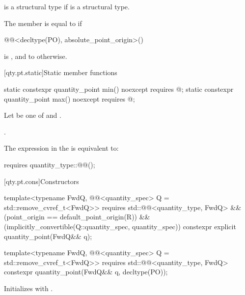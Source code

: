 \pnum
{} is a structural type
if  is a structural type.

\pnum
The member  is equal to  if
\begin{codeblock}
@@<decltype(PO), absolute_point_origin>()
\end{codeblock}
is , and
to  otherwise.

[qty.pt.static]{Static member functions}

\begin{itemdecl}
static constexpr quantity_point min() noexcept
  requires @\seebelownc@;
static constexpr quantity_point max() noexcept
  requires @\seebelownc@;
\end{itemdecl}

\begin{itemdescr}
\pnum
Let  be one of  and .

\pnum
\returns
{}.

\pnum
\remarks
The expression in the  is equivalent to:
\begin{codeblock}
requires { quantity_type::@@(); }
\end{codeblock}
\end{itemdescr}

[qty.pt.cons]{Constructors}

\begin{itemdecl}
template<typename FwdQ, @@<quantity_spec> Q = std::remove_cvref_t<FwdQ>>
  requires std::@@<quantity_type, FwdQ> &&
           (point_origin == default_point_origin(R)) &&
           (implicitly_convertible(Q::quantity_spec, quantity_spec))
constexpr explicit quantity_point(FwdQ&& q);

template<typename FwdQ, @@<quantity_spec> Q = std::remove_cvref_t<FwdQ>>
  requires std::@@<quantity_type, FwdQ>
constexpr quantity_point(FwdQ&& q, decltype(PO));
\end{itemdecl}

\begin{itemdescr}
\pnum
\effects
Initializes  with .
\end{itemdescr}

